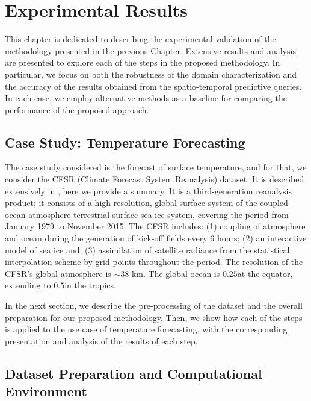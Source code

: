 \chapter{Experimental Results}
\label{chapter_Experimental_Results}

This chapter is dedicated to describing the experimental validation of the methodology presented in the previous Chapter. Extensive results and analysis are presented to explore each of the steps in the proposed methodology. In particular, we focus on both the robustness of the domain characterization and the accuracy of the results obtained from the spatio-temporal predictive queries. In each case, we employ alternative methods as a baseline for comparing the performance of the proposed approach.

\section{Case Study: Temperature Forecasting}

The case study considered is the forecast of surface temperature, and for that, we consider the CFSR (Climate Forecast System Reanalysis) dataset. It is described extensively in \cite{Saha2010}, here we provide a summary. It is a third-generation reanalysis product; it consists of a high-resolution, global surface system of the coupled ocean-atmosphere-terrestrial surface-sea ice system, covering the period from January 1979 to November 2015. The CFSR includes: (1) coupling of atmosphere and ocean during the generation of kick-off fields every 6 hours; (2) an interactive model of sea ice and; (3) assimilation of satellite radiance from the statistical interpolation scheme by grid points throughout the period. The resolution of the CFSR's global atmosphere is $\sim 38$ km. The global ocean is $0.25$\textdegree at the equator, extending to $0.5$\textdegree in the tropics. 

In the next section, we describe the pre-processing of the dataset and the overall preparation for our proposed methodology. Then, we show how each of the steps is applied to the use case of temperature forecasting, with the corresponding presentation and analysis of the results of each step.

\section{Dataset Preparation and Computational Environment}
\label{sec:DatasetPreparation}

